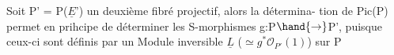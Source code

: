 Soit P' = P($\underline{E}$') un deuxième fibré projectif, alors la détermina-%
tion de Pic(P) permet en prihcipe de déterminer les S-morphismes
g:P$\hand{\to}$P', puisque ceux-ci sont définis par un Module inversible $\underline{L}$ ($\simeq g^*\mathcal{O}_{P'}(1)$) sur P\placedmargin{\ensuremath{/}}

